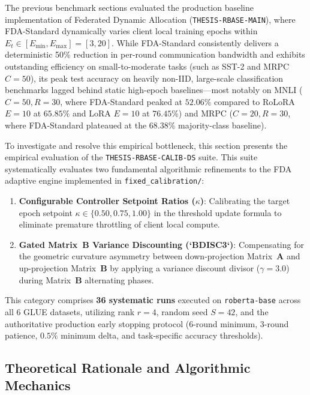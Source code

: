 \documentclass[10pt,a4paper]{article}
\begin{document}
The previous benchmark sections evaluated the production baseline implementation of Federated Dynamic Allocation (\texttt{THESIS-RBASE-MAIN}), where FDA-Standard dynamically varies client local training epochs within $E_t \in [E_{\min}, E_{\max}] = [3, 20]$.
While FDA-Standard consistently delivers a deterministic 50\% reduction in per-round communication bandwidth and exhibits outstanding efficiency on small-to-moderate tasks (such as SST-2 and MRPC $C=50$), its peak test accuracy on heavily non-IID, large-scale classification benchmarks lagged behind static high-epoch baselines---most notably on MNLI ($C=50, R=30$, where FDA-Standard peaked at $52.06\%$ compared to RoLoRA $E=10$ at $65.85\%$ and LoRA $E=10$ at $76.45\%$) and MRPC ($C=20, R=30$, where FDA-Standard plateaued at the $68.38\%$ majority-class baseline).

To investigate and resolve this empirical bottleneck, this section presents the empirical evaluation of the \texttt{THESIS-RBASE-CALIB-DS} suite.
This suite systematically evaluates two fundamental algorithmic refinements to the FDA adaptive engine implemented in \texttt{fixed\_calibration/}:
\begin{enumerate}
    \item \textbf{Configurable Controller Setpoint Ratios ($\kappa$)}: Calibrating the target epoch setpoint $\kappa \in \{0.50, 0.75, 1.00\}$ in the threshold update formula to eliminate premature throttling of client local compute.
    \item \textbf{Gated Matrix~B Variance Discounting (`BDISC3`)}: Compensating for the geometric curvature asymmetry between down-projection Matrix~$\mathbf{A}$ and up-projection Matrix~$\mathbf{B}$ by applying a variance discount divisor ($\gamma = 3.0$) during Matrix~$\mathbf{B}$ alternating phases.
\end{enumerate}
This category comprises \textbf{36 systematic runs} executed on \texttt{roberta-base} across all 6 GLUE datasets, utilizing rank $r=4$, random seed $S=42$, and the authoritative production early stopping protocol ($6$-round minimum, $3$-round patience, $0.5\%$ minimum delta, and task-specific accuracy thresholds).

\subsection{Theoretical Rationale and Algorithmic Mechanics}
\end{document}

